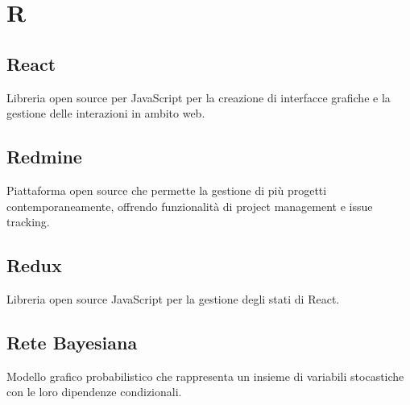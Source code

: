 \section*{R}
\subsection*{React}
Libreria open source per JavaScript per la creazione di interfacce grafiche e la gestione delle interazioni in ambito web.

\subsection*{Redmine}
Piattaforma open source che permette la gestione di più progetti contemporaneamente, offrendo funzionalità di project management e issue tracking.

\subsection*{Redux}
Libreria open source JavaScript per la gestione degli stati di React.

\subsection*{Rete Bayesiana}
Modello grafico probabilistico che rappresenta un insieme di variabili stocastiche con le loro dipendenze condizionali.

